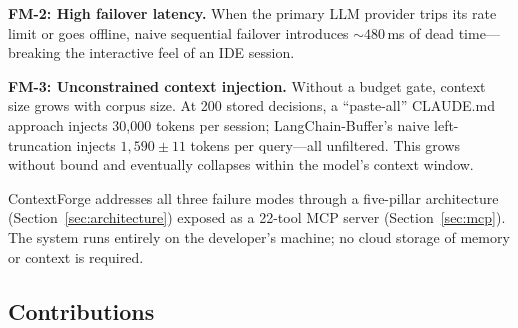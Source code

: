 \documentclass[11pt,twocolumn]{article}
\begin{document}
\textbf{FM-2: High failover latency.}
When the primary LLM provider trips its rate limit or goes offline, naive
sequential failover introduces ${\sim}480$\,ms of dead time---breaking the
interactive feel of an IDE session.

\textbf{FM-3: Unconstrained context injection.}
Without a budget gate, context size grows with corpus size. At 200 stored
decisions, a ``paste-all'' CLAUDE.md approach injects 30{,}000 tokens per
session; LangChain-Buffer's naive left-truncation injects $1{,}590 \pm 11$
tokens per query---all unfiltered. This grows without bound and eventually
collapses within the model's context window.

ContextForge addresses all three failure modes through a five-pillar
architecture (Section~\ref{sec:architecture}) exposed as a 22-tool MCP server
(Section~\ref{sec:mcp}). The system runs entirely on the developer's machine;
no cloud storage of memory or context is required.

\subsection*{Contributions}
\end{document}
